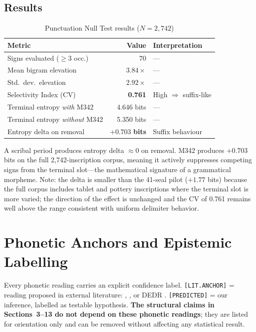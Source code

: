 \documentclass[12pt,letterpaper]{article}
\newcommand{\PREDICTED}{\textcolor{predorange}{\texttt{[PREDICTED]}}}
\begin{document}
\subsection{Results}

\begin{table}[htbp]
\centering
\caption{Punctuation Null Test results ($N = 2{,}742$)}
\begin{tabularx}{\textwidth}{lrX}
\toprule
Metric & Value & Interpretation \\
\midrule
Signs evaluated ($\geq$3 occ.)  & 70   & --- \\
Mean bigram elevation            & $3.84\times$ & --- \\
Std.\ dev.\ elevation            & $2.92\times$ & --- \\
Selectivity Index (CV)           & \textbf{0.761} & High $\Rightarrow$ suffix-like \\
Terminal entropy \emph{with} M342    & 4.646 bits & --- \\
Terminal entropy \emph{without} M342 & 5.350 bits & --- \\
Entropy delta on removal         & $\mathbf{+0.703}$ \textbf{bits} & Suffix behaviour \\
\bottomrule
\end{tabularx}
\end{table}

A scribal period produces entropy delta $\approx 0$ on removal.
M342 produces $+0.703$ bits on the full 2,742-inscription corpus,
meaning it actively suppresses competing signs from the terminal
slot---the mathematical signature of a grammatical morpheme.
Note: the delta is smaller than the 41-seal pilot ($+1.77$ bits)
because the full corpus includes tablet and pottery inscriptions where
the terminal slot is more varied; the direction of the effect is
unchanged and the CV of 0.761 remains well above the range
consistent with uniform delimiter behavior.

\section{Phonetic Anchors and Epistemic Labelling}
\label{sec:phonetics}

Every phonetic reading carries an explicit confidence label.
\texttt{[LIT.ANCHOR]} = reading proposed in external literature: \citet{Parpola1994},
\citet{Mahadevan1977}, or DEDR \citep{Burrow1984}.
\PREDICTED{} = our inference, labelled as testable hypothesis.
\textbf{The structural claims in Sections~3--13 do not depend on
these phonetic readings}; they are listed for orientation only and
can be removed without affecting any statistical result.
\end{document}
